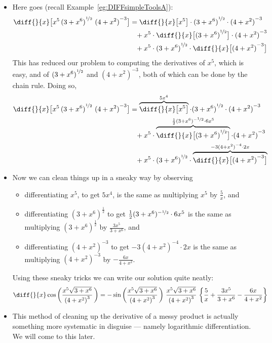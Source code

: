 \begin{eg}
\begin{itemize}
\item Here goes (recall Example~\ref{eg:DIFFsimpleToolsA}):
\begin{align*}
\diff{}{x}\big[x^5\,{(3+x^6)}^{\nicefrac{1}{2}}\ {(4+x^2)}^{-3}\big]
&=\diff{}{x}\big[x^5\big] \cdot {(3+x^6)}^{\nicefrac{1}{2}}\cdot {(4+x^2)}^{-3}\\
&\phantom{=} +x^5\cdot \diff{}{x}\big[{(3+x^6)}^{\nicefrac{1}{2}}\big]
    \cdot {(4+x^2)}^{-3} \\
&\phantom{=} +x^5\cdot {(3+x^6)}^{\nicefrac{1}{2}}\cdot
           \diff{}{x}\big[{(4+x^2)}^{-3}\big]
\end{align*}
This has reduced our problem to computing the derivatives of $x^5$, which
is easy, and of ${(3+x^6)}^{\nicefrac{1}{2}}$ and ${(4+x^2)}^{-3}$,
both of which can be done by the chain rule. Doing so,
\begin{align*}
\diff{}{x}\big[x^5\,{(3+x^6)}^{\nicefrac{1}{2}}\ {(4+x^2)}^{-3}\big]
&=\overbrace{\diff{}{x}\big[x^5\big]}^{5x^4}
     \cdot{(3+x^6)}^{\nicefrac{1}{2}}\cdot {(4+x^2)}^{-3}\\
& \phantom{=}+x^5\cdot
    \overbrace{\diff{}{x}\big[{(3+x^6)}^{\nicefrac{1}{2}}\big]}^
                     {\frac{1}{2}(3+x^6)^{-\nicefrac{1}{2}}\cdot 6x^5}
    \cdot {(4+x^2)}^{-3} \\
&\phantom{=} +x^5\cdot{(3+x^6)}^{\nicefrac{1}{2}}\cdot
   \overbrace{\diff{}{x}\big[{(4+x^2)}^{-3}\big]}^
      {-3{(4+x^2)}^{-4}\cdot 2x} \\
\end{align*}
\item Now we can clean things up in a sneaky way by observing
\begin{itemize}
\item differentiating $x^5$, to get $5x^4$, is the same as multiplying $x^5$
by $\frac{5}{x}$, and
\item differentiating ${(3+x^6)}^{\frac{1}{2}}$ to get
$\frac{1}{2}(3+x^6)^{-\nicefrac{1}{2}}\cdot 6x^5$ is the same as
multiplying ${(3+x^6)}^{\frac{1}{2}}$ by  $\frac{3x^5}{3+x^6}$, and
\item differentiating ${(4+x^2)}^{-3}$ to get  $-3{(4+x^2)}^{-4}\cdot 2x$
is the same as multiplying ${(4+x^2)}^{-3}$ by $-\frac{6x}{4+x^2}$.
\end{itemize}
Using these sneaky tricks we can write our solution quite neatly:
\begin{align*}
\diff{}{x}\cos\bigg(\frac{x^5\sqrt{3+x^6}}{{(4+x^2)}^3}\,\bigg)
=-\sin\bigg(\frac{x^5\sqrt{3+x^6}}{{(4+x^2)}^3}\,\bigg)\
\frac{x^5\sqrt{3+x^6}}{{(4+x^2)}^3}\
\bigg\{\frac{5}{x}+\frac{3x^5}{3+x^6}-\frac{6x}{4+x^2}\bigg\}
\end{align*}
\item This method of cleaning up the derivative of a messy product is actually something
more systematic in disguise --- namely logarithmic differentiation. We will come to
this later.
\end{itemize}
\end{eg}



